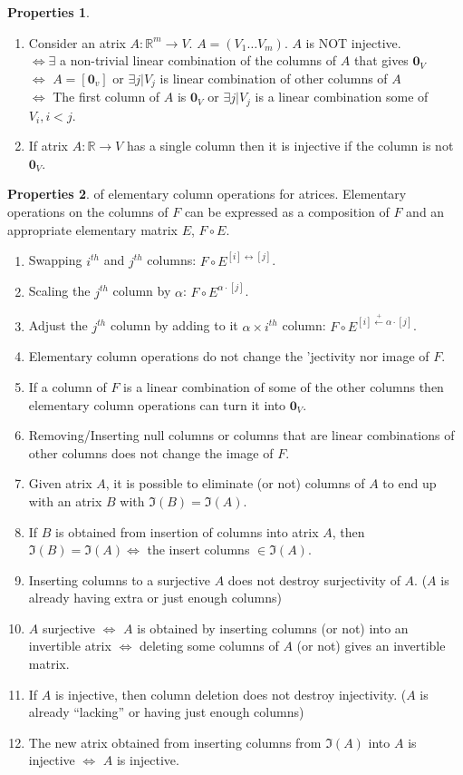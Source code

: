 \documentclass{book}
\theoremstyle{definition}
\newtheorem{prop}{Properties}[section]
\newcommand{\R}{\mathbb{R}}
\begin{document}
\begin{prop}
\begin{enumerate}
	\item Consider an atrix $A : \R^m \rightarrow V$. $A = (V_1\dots V_m)$. $A$ is NOT injective.\\
	$\iff \exists$ a non-trivial linear combination of the columns of $A$ that gives $\mathbf{0}_V$\\
	$\iff$ $A = [\mathbf{0}_v]$ or $\exists j \vert V_j$ is linear combination of other columns of $A$\\
	$\iff$ The first column of $A$ is $\mathbf{0}_V$ or $\exists j \vert V_j$ is a linear combination some of $V_i, i < j$.
	\item If atrix $A: \R \rightarrow V$ has a single column then it is injective if the column is not $\mathbf{0}_V$.
	\end{enumerate}
\end{prop}
\begin{prop}
	of elementary column operations for atrices. Elementary operations on the columns of $F$ can be expressed as a composition of $F$ and an appropriate elementary matrix $E$, $F\circ E$. 
	\begin{enumerate}
		\item Swapping $i^{th}$ and $j^{th}$ columns: $F\circ E^{[i]\leftrightarrow[j]}$.
		\item Scaling the $j^{th}$ column by $\alpha$: $F\circ E^{\alpha\cdot[j]}$.
		\item Adjust the $j^{th}$ column by adding to it $\alpha\times i^{th}$ column: $F\circ E^{[i]\stackrel{+}\leftarrow \alpha\cdot[j]}$.
		\item Elementary column operations do not change the 'jectivity nor image of $F$.
		\item If a column of $F$ is a linear combination of some of the other columns then elementary column operations can turn it into $\mathbf{0}_V$.
		\item Removing/Inserting null columns or columns that are linear combinations of other columns does not change the image of $F$.
		\item Given atrix $A$, it is possible to eliminate (or not) columns of $A$ to end up with an atrix $B$ with $\Im(B) = \Im(A)$.
		\item If $B$ is obtained from insertion of columns into atrix $A$, then $\Im(B) = \Im(A) \iff$ the insert columns $\in \Im(A)$.
		\item Inserting columns to a surjective $A$ does not destroy surjectivity of $A$. ($A$ is already having extra or just enough columns) 
		\item $A$ surjective $\iff$ $A$ is obtained by inserting columns (or not) into an invertible atrix $\iff$ deleting some columns of $A$ (or not) gives an invertible matrix.
		\item If $A$ is injective, then column deletion does not destroy injectivity. ($A$ is already ``lacking'' or having just enough columns)
		\item The new atrix obtained from inserting columns from $\Im(A)$ into $A$ is injective $\iff$ $A$ is injective.
	\end{enumerate}
\end{prop}
\end{document}
